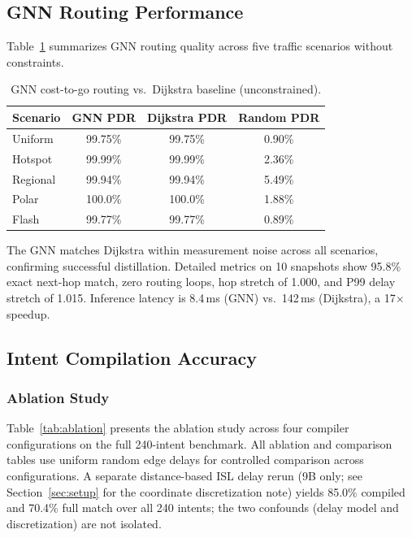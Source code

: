 \documentclass[10pt, conference, letterpaper]{IEEEtran}
\begin{document}
\subsection{GNN Routing Performance}
\label{sec:eval_gnn}

Table~\ref{tab:gnn_baseline} summarizes GNN routing quality across
five traffic scenarios without constraints.

\begin{table}[t]
\centering
\caption{GNN cost-to-go routing vs.\ Dijkstra baseline (unconstrained).}
\label{tab:gnn_baseline}
\begin{tabular}{lccc}
\toprule
\textbf{Scenario} & \textbf{GNN PDR} & \textbf{Dijkstra PDR} & \textbf{Random PDR} \\
\midrule
Uniform    & 99.75\% & 99.75\% & 0.90\% \\
Hotspot    & 99.99\% & 99.99\% & 2.36\% \\
Regional   & 99.94\% & 99.94\% & 5.49\% \\
Polar      & 100.0\% & 100.0\% & 1.88\% \\
Flash      & 99.77\% & 99.77\% & 0.89\% \\
\bottomrule
\end{tabular}
\end{table}

The GNN matches Dijkstra within measurement noise across all scenarios,
confirming successful distillation. Detailed metrics on 10 snapshots
show 95.8\% exact next-hop match, zero routing loops, hop stretch of
1.000, and P99 delay stretch of 1.015. Inference latency is 8.4\,ms
(GNN) vs.\ 142\,ms (Dijkstra), a 17$\times$ speedup.

\subsection{Intent Compilation Accuracy}
\label{sec:eval_compiler}

\subsubsection{Ablation Study}

Table~\ref{tab:ablation} presents the ablation study across four
compiler configurations on the full 240-intent benchmark. All ablation
and comparison tables use uniform random edge delays for controlled
comparison across configurations. A separate distance-based ISL delay rerun
(9B only; see Section~\ref{sec:setup} for the coordinate discretization note)
yields 85.0\% compiled and 70.4\% full match over all 240 intents;
the two confounds (delay model and discretization) are not isolated.
\end{document}

